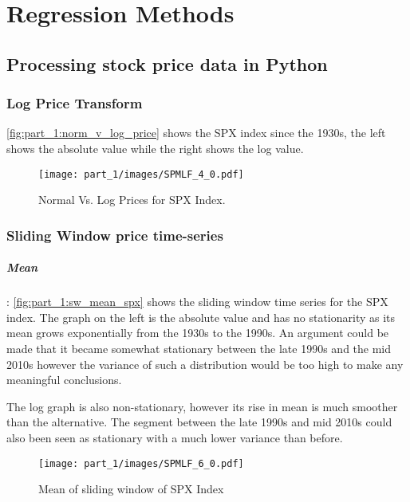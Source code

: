 \chapter{Regression Methods}

\section{Processing stock price data in Python}

\subsection{Log Price Transform}

\autoref{fig:part_1:norm_v_log_price} shows the SPX index since the 1930s, the left shows the absolute value while the right shows the log value.

\begin{figure}[!htb]
    \centering
    \texttt{[image: part\_1/images/SPMLF\_4\_0.pdf]}
    \caption{Normal Vs. Log Prices for SPX Index.}
    \label{fig:part_1:norm_v_log_price}
\end{figure}

\subsection{Sliding Window price time-series}

\paragraph{Mean}: \autoref{fig:part_1:sw_mean_spx} shows the sliding window time series for the SPX index. The graph on the left is the absolute value and has no stationarity as its mean grows exponentially from the 1930s to the 1990s. An argument could be made that it became somewhat stationary between the late 1990s and the mid 2010s however the variance of such a distribution would be too high to make any meaningful conclusions. 

The log graph is also non-stationary, however its rise in mean is much smoother than the alternative. The segment between the late 1990s and mid 2010s could also been seen as stationary with a much lower variance than before.

\begin{figure}[!htb]
    \centering
    \texttt{[image: part\_1/images/SPMLF\_6\_0.pdf]}
    \caption{Mean of sliding window of SPX Index}
    \label{fig:part_1:sw_mean_spx}
\end{figure}

